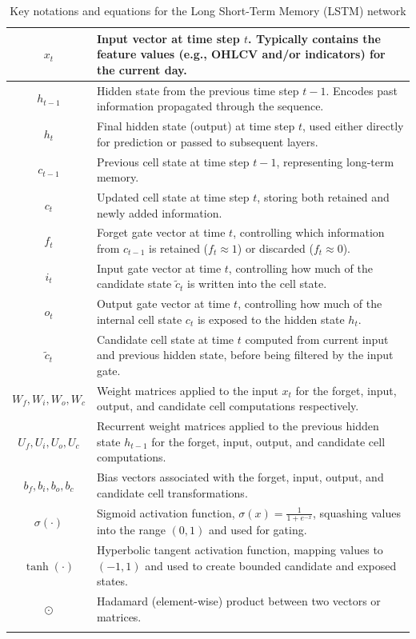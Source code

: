\begin{center}
\begin{longtable}{|c|p{}|}
$x_t$      & Input vector at time step $t$. Typically contains the feature values (e.g., OHLCV and/or indicators) for the current day. \\ \hline
$h_{t-1}$  & Hidden state from the previous time step $t-1$. Encodes past information propagated through the sequence. \\ \hline
$h_t$      & Final hidden state (output) at time step $t$, used either directly for prediction or passed to subsequent layers. \\ \hline
$c_{t-1}$  & Previous cell state at time step $t-1$, representing long-term memory. \\ \hline
$c_t$      & Updated cell state at time step $t$, storing both retained and newly added information. \\ \hline
$f_t$      & Forget gate vector at time $t$, controlling which information from $c_{t-1}$ is retained ($f_t \approx 1$) or discarded ($f_t \approx 0$). \\ \hline
$i_t$      & Input gate vector at time $t$, controlling how much of the candidate state $\tilde{c}_t$ is written into the cell state. \\ \hline
$o_t$      & Output gate vector at time $t$, controlling how much of the internal cell state $c_t$ is exposed to the hidden state $h_t$. \\ \hline
$\tilde{c}_t$ & Candidate cell state at time $t$ computed from current input and previous hidden state, before being filtered by the input gate. \\ \hline
$W_f, W_i, W_o, W_c$ & Weight matrices applied to the input $x_t$ for the forget, input, output, and candidate cell computations respectively. \\ \hline
$U_f, U_i, U_o, U_c$ & Recurrent weight matrices applied to the previous hidden state $h_{t-1}$ for the forget, input, output, and candidate cell computations. \\ \hline
$b_f, b_i, b_o, b_c$ & Bias vectors associated with the forget, input, output, and candidate cell transformations. \\ \hline
$\sigma(\cdot)$ & Sigmoid activation function, $\sigma(x) = \frac{1}{1 + e^{-x}}$, squashing values into the range $(0, 1)$ and used for gating. \\ \hline
$\tanh(\cdot)$ & Hyperbolic tangent activation function, mapping values to $(-1, 1)$ and used to create bounded candidate and exposed states. \\ \hline
$\odot$    & Hadamard (element-wise) product between two vectors or matrices. \\ \hline

\caption{Key notations and equations for the Long Short-Term Memory (LSTM) network}
\label{tab:lstm_notation}
\end{longtable}
\end{center}

